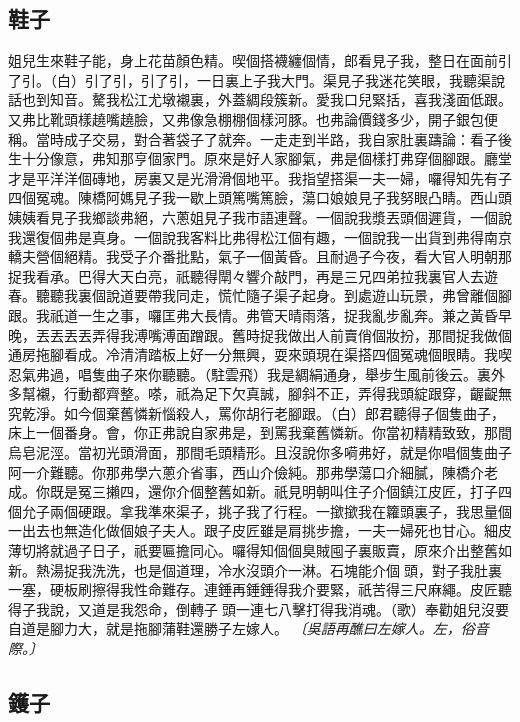 \subsection*{鞋子}

姐兒生來鞋子能，身上花苗顏色精。喫個搭襪纏個情，郎看見子我，整日在面前引了引。（白）引了引，引了引，一日裏上子我大門。渠見子我迷花笑眼，我聽渠說話也到知音。驁我松江尤墩襯裏，外蓋綢段簇新。愛我口兒緊括，喜我淺面低跟。又弗比靴頭樣趬嘴趬臉，又弗像急棚棚個樣河豚。也弗論價錢多少，開子銀包便稱。當時成子交易，對合著袋子了就奔。一走走到半路，我自家肚裏躊論：看子後生十分像意，弗知那亨個家門。原來是好人家腳氣，弗是個樣打弗穿個腳跟。廳堂才是平洋洋個磚地，房裏又是光滑滑個地平。我指望搭渠一夫一婦，囉得知先有子四個冤魂。陳橋阿媽見子我一歇上頭篤嘴篤臉，蕩口娘娘見子我努眼凸睛。西山頭姨姨看見子我鄉談弗絕，六蔥姐見子我市語連聲。一個說我漿丟頭個遲貨，一個說我還復個弗是真身。一個說我客料比弗得松江個有趣，一個說我一出貨到弗得南京轎夫營個絕精。我受子介番批點，氣子一個黃昏。且耐過子今夜，看大官人明朝那捉我看承。巴得大天白亮，祇聽得閛々響介敲門，再是三兄四弟拉我裏官人去遊春。聽聽我裏個說道要帶我同走，慌忙隨子渠子起身。到處遊山玩景，弗曾離個腳跟。我祇道一生之事，囉匡弗大長情。弗管天晴雨落，捉我亂步亂奔。兼之黃昏早晚，丟丟丟丟弄得我溥嘴溥面蹭跟。舊時捉我做出人前賣俏個妝扮，那間捉我做個通房拖腳看成。冷清清踏板上好一分無興，耍來頭現在渠搭四個冤魂個眼睛。我喫忍氣弗過，唱隻曲子來你聽聽。（駐雲飛）我是綢絹通身，舉步生風前後云。裏外多幫襯，行動都齊整。嗏，祇為足下欠真誠，腳斜不正，弄得我頭綻跟穿，齷齪無究乾淨。如今個棄舊憐新惱殺人，罵你胡行老腳跟。（白）郎君聽得子個隻曲子，床上一個番身。會，你正弗說自家弗是，到罵我棄舊憐新。你當初精精致致，那間烏皂泥涇。當初光頭滑面，那間毛頭精形。且沒說你多嗬弗好，就是你唱個隻曲子阿一介難聽。你那弗學六蔥介省事，西山介儉純。那弗學蕩口介細膩，陳橋介老成。你既是冤三攋四，還你介個整舊如新。祇見明朝叫住子介個鎮江皮匠，打子四個允子兩個硬跟。拿我準來渠子，挑子我了行程。一撳撳我在籮頭裏子，我思量個一出去也無造化做個娘子夫人。跟子皮匠雖是肩挑步擔，一夫一婦死也甘心。細皮薄切將就過子日子，祇要匾擔同心。囉得知個個臭賊囤子裏販賣，原來介出整舊如新。熱湯捉我洗洗，也是個道理，冷水沒頭介一淋。石塊能介個𩋢頭，對子我肚裏一塞，硬板刷擦得我性命難存。連錘再錘錘得我介要緊，祇苦得三尺麻繩。皮匠聽得子我說，又道是我怨命，倒轉子𩋢頭一連七八擊打得我消魂。（歌）奉勸姐兒沒要自道是腳力大，就是拖腳蒲鞋還勝子左嫁人。
\textit{〔吳語再醮曰左嫁人。左，俗音際。〕}

\subsection*{鑊子}

